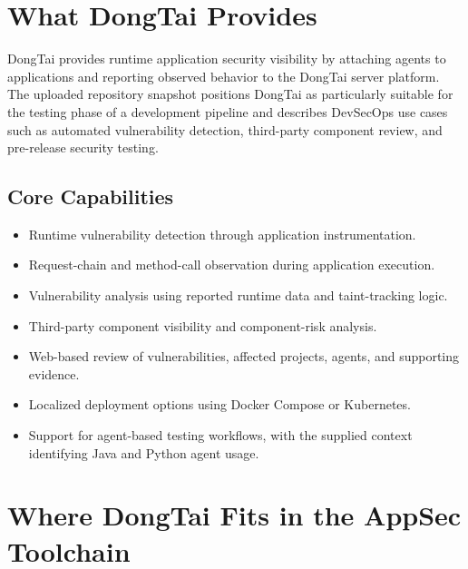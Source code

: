 \documentclass[11pt]{article}
\begin{document}
\section{What DongTai Provides}

DongTai provides runtime application security visibility by attaching agents to applications and reporting observed behavior to the DongTai server platform. The uploaded repository snapshot positions DongTai as particularly suitable for the testing phase of a development pipeline and describes DevSecOps use cases such as automated vulnerability detection, third-party component review, and pre-release security testing.

\subsection{Core Capabilities}

\begin{itemize}
  \item Runtime vulnerability detection through application instrumentation.
  \item Request-chain and method-call observation during application execution.
  \item Vulnerability analysis using reported runtime data and taint-tracking logic.
  \item Third-party component visibility and component-risk analysis.
  \item Web-based review of vulnerabilities, affected projects, agents, and supporting evidence.
  \item Localized deployment options using Docker Compose or Kubernetes.
  \item Support for agent-based testing workflows, with the supplied context identifying Java and Python agent usage.
\end{itemize}

\section{Where DongTai Fits in the AppSec Toolchain}
\end{document}
